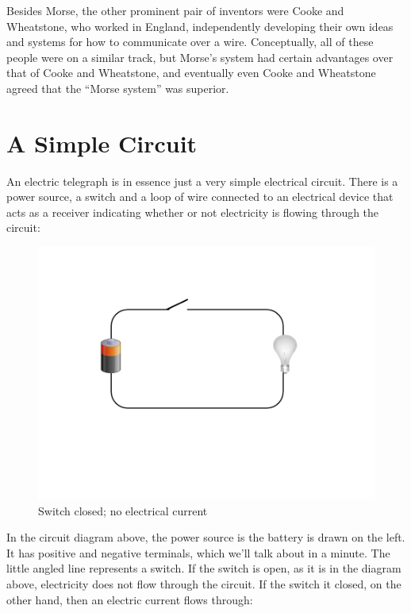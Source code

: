 \documentclass[UTF8]{book}
\begin{document}
\begin{CJK}{UTF8}{gbsn}
Besides Morse, the other prominent pair of inventors were Cooke and Wheatstone, who worked in England, independently developing their own ideas and systems for how to communicate over a wire. Conceptually, all of these people were on a similar track, but Morse's system had certain advantages over that of Cooke and Wheatstone, and eventually even Cooke and Wheatstone agreed that the ``Morse system'' was superior.

\section{A Simple Circuit}

An electric telegraph is in essence just a very simple electrical circuit. There is a power source, a switch and a loop of wire connected to an electrical device that acts as a receiver indicating whether or not electricity is flowing through the circuit:

\begin{figure}[H]
\centering
\includegraphics[width=0.8\linewidth]{circuit1}
\caption{Switch closed; no electrical current}
\end{figure}


In the circuit diagram above, the power source is the battery is drawn on the left. It has positive and negative terminals, which we'll talk about in a minute. The little angled line represents a switch. If the switch is open, as it is in the diagram above, electricity does not flow through the circuit. If the switch it closed, on the other hand, then an electric current flows through:


\end{CJK}
\end{document}
